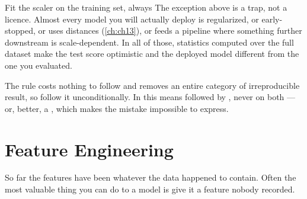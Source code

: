 \begin{pitfall}{Fit the scaler on the training set, always}
The exception above is a trap, not a licence. Almost every model you will
actually deploy is regularized, or early-stopped, or uses distances
(\cref{ch:ch13}), or feeds a pipeline where something further downstream is
scale-dependent. In all of those, statistics computed over the full dataset make
the test score optimistic and the deployed model different from the one you
evaluated.

The rule costs nothing to follow and removes an entire category of
irreproducible result, so follow it unconditionally. In  this
means  followed by ,
never  on both --- or, better, a , which
makes the mistake impossible to express.
\end{pitfall}

\section{Feature Engineering}
\label{sec:feature-engineering}

So far the features have been whatever the data happened to contain. Often the
most valuable thing you can do to a model is give it a feature nobody recorded.

